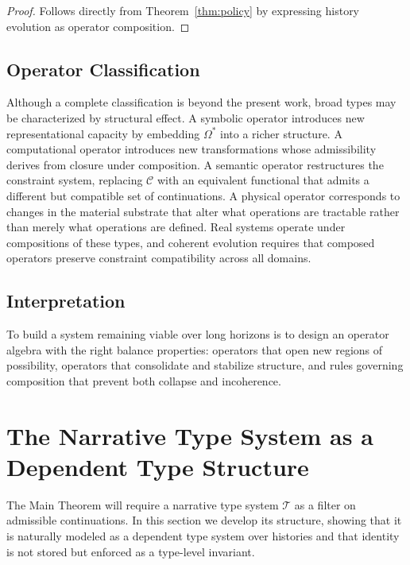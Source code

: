 \documentclass[12pt, a4paper]{article}
\theoremstyle{plain}
\theoremstyle{definition}
\theoremstyle{remark}
\begin{document}
\begin{proof}
Follows directly from Theorem~\ref{thm:policy} by expressing history evolution as operator composition.
\end{proof}

\subsection{Operator Classification}

Although a complete classification is beyond the present work, broad types may be characterized by structural effect. A symbolic operator introduces new representational capacity by embedding $\Omega^*$ into a richer structure. A computational operator introduces new transformations whose admissibility derives from closure under composition. A semantic operator restructures the constraint system, replacing $\mathcal{C}$ with an equivalent functional that admits a different but compatible set of continuations. A physical operator corresponds to changes in the material substrate that alter what operations are tractable rather than merely what operations are defined. Real systems operate under compositions of these types, and coherent evolution requires that composed operators preserve constraint compatibility across all domains.

\subsection{Interpretation}

To build a system remaining viable over long horizons is to design an operator algebra with the right balance properties: operators that open new regions of possibility, operators that consolidate and stabilize structure, and rules governing composition that prevent both collapse and incoherence.

\section{The Narrative Type System as a Dependent Type Structure}

The Main Theorem will require a narrative type system $\mathcal{T}$ as a filter on admissible continuations. In this section we develop its structure, showing that it is naturally modeled as a dependent type system over histories and that identity is not stored but enforced as a type-level invariant.
\end{document}
